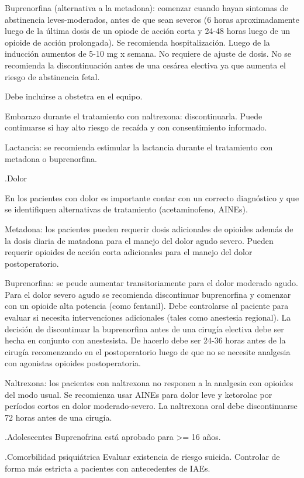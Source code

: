Buprenorfina (alternativa a la metadona): comenzar cuando hayan sintomas de abstinencia leves-moderados, antes de que sean severos (6 horas aproximadamente luego de la última dosis de un opiode de acción corta y 24-48 horas luego de un opioide de acción prolongada). Se recomienda hospitalización. Luego de la inducción aumentos de 5-10 mg x semana. No requiere de ajuste de dosis. No se recomienda la discontinuación antes de una cesárea electiva ya que aumenta el riesgo de abstinencia fetal.

Debe incluirse a obstetra en el equipo.

Embarazo durante el tratamiento con naltrexona: discontinuarla. Puede continuarse si hay alto riesgo de recaída y con consentimiento informado.

Lactancia: se recomienda estimular la lactancia durante el tratamiento con metadona o buprenorfina.

.Dolor

En los pacientes con dolor es importante contar con un correcto diagnóstico y que se identifiquen alternativas de tratamiento (acetaminofeno, AINEs).

Metadona: los pacientes pueden requerir dosis adicionales de opioides además de la dosis diaria de matadona para el manejo del dolor agudo severo. Pueden requerir opioides de acción corta adicionales para el manejo del dolor postoperatorio.

Buprenorfina: se peude aumentar transitoriamente para el dolor moderado agudo. Para el dolor severo agudo se recomienda discontinuar buprenorfina y comenzar con un opioide alta potencia (como fentanil). Debe controlarse al paciente para evaluar si necesita intervenciones adicionales (tales como anestesia regional).
La decisión de discontinuar la buprenorfina antes de una cirugía electiva debe ser hecha en conjunto con anestesista. De hacerlo debe ser 24-36 horas antes de la cirugía recomenzando en el postoperatorio luego de que no se necesite analgesia con agonistas opioides postoperatoria.

Naltrexona: los pacientes con naltrexona no responen a la analgesia con opioides del modo usual. Se recomienza usar AINEs para dolor leve y ketorolac por períodos cortos en dolor moderado-severo.
La naltrexona oral debe discontinuarse 72 horas antes de una cirugía.

.Adolescentes
Buprenofrina está aprobado para >= 16 años.

.Comorbilidad psiquiátrica
Evaluar existencia de riesgo suicida.
Controlar de forma más estricta a pacientes con antecedentes de IAEs.


